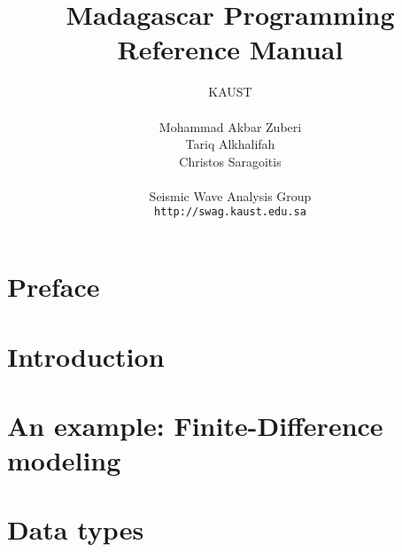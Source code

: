 %
%


\title{Madagascar Programming Reference Manual}
\author{KAUST\\
               \\
               Mohammad Akbar Zuberi\\
               Tariq Alkhalifah\\
               Christos Saragoitis\\
               \\
               Seismic Wave Analysis Group\\
               \texttt{http://swag.kaust.edu.sa}\\}
\date{}   


\maketitle
\cleardoublepage

\tableofcontents{}
\cleardoublepage

\chapter*{Preface}


\chapter{Introduction}


\chapter{An example: Finite-Difference modeling}



\chapter{Data types}\label{sec:datatypes}
  

